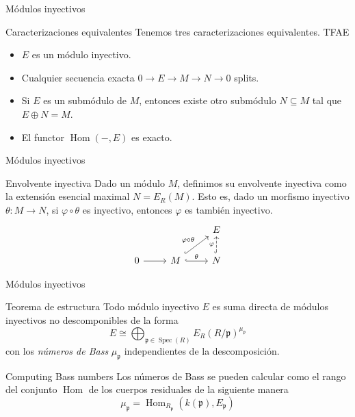 \documentclass{beamer}
\DeclareMathOperator{\Hom}{Hom}
\DeclareMathOperator{\Spec}{Spec}
\begin{document}
\begin{frame}[fragile]{Módulos inyectivos}
\begin{block}{Caracterizaciones equivalentes}
  Tenemos tres caracterizaciones equivalentes. TFAE
\begin{itemize}
  \item $E$ es un módulo inyectivo.
  \item Cualquier secuencia exacta  $0\to E \to M \to N\to 0$ splits.
  \item Si  $E$ es un submódulo de $M$, entonces existe otro submódulo $N\subseteq M$ tal que $E \oplus N = M$.
  \item El functor $\Hom(-,E)$ es exacto.
\end{itemize}
\end{block}
\end{frame}



\begin{frame}[fragile]{Módulos inyectivos}
\begin{block}{Envolvente inyectiva}
Dado un módulo $M$, definimos su envolvente inyectiva como la extensión esencial maximal $N = E_R(M)$. Esto es, dado un morfismo inyectivo $\theta :M\to N$, si $\varphi \circ \theta $  es inyectivo, entonces $\varphi $ es también inyectivo.
\[\begin{tikzcd}
	&& E \\
	0 & M & N
	\arrow[from=2-1, to=2-2]
	\arrow["\theta", hook, from=2-2, to=2-3]
	\arrow["\varphi", dashed, hook, from=2-3, to=1-3]
	\arrow["\varphi\circ\theta", hook, from=2-2, to=1-3]
\end{tikzcd}\]
\end{block}
\end{frame}


\begin{frame}[fragile]{Módulos inyectivos}
\begin{block}{Teorema de estructura}
  Todo módulo inyectivo $E$ es suma directa de módulos inyectivos no descomponibles de la forma
  \[
	E \cong \bigoplus _{\mathfrak{p}\in \Spec (R)} E_R( R / \mathfrak{p})^{\mu _{\mathfrak{p}}}
  \] 
con los \textit{números de Bass} $\mu _{\mathfrak{p}}$ independientes de la descomposición. 
\end{block}
\begin{block}{Computing Bass numbers}
  Los números de Bass se pueden calcular como el rango del conjunto $\Hom$ de los cuerpos residuales de la siguiente manera
 \[
\mu _{\mathfrak{p}} =\Hom _{R_{\mathfrak{p}}}(k(\mathfrak{p}), E_{\mathfrak{p}})
\] 
\end{block}
\end{frame}
\end{document}

